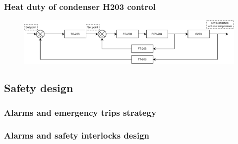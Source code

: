 \subsubsection{Heat duty of condenser H203 control}
\begin{figure}[H]
    \centering
    \includegraphics[width=\linewidth]{chapters/4-operation-control/4-Figures/S203C-TC.pdf}
    \caption{}
    \label{fig:S203C-TC}
\end{figure}


\subsubsection{}

\subsection{Safety design}

\subsubsection{Alarms and emergency trips strategy}

\subsubsection{Alarms and safety interlocks design}